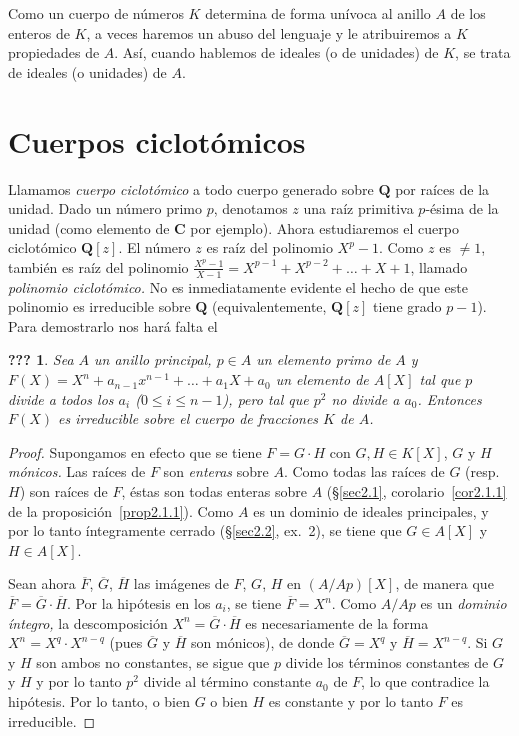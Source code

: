 \documentclass[10pt,oneside,bibtotoc,smallheadings,leqno,a5paper,DIV=12]{scrbook}
\newcommand{\QQ}{\mathbf{Q}}
\newcommand{\CC}{\mathbf{C}}
\newcommand{\QED}{}%
\newcommand{\oline}[1]{\overline{#1}}
\numberwithin{equation}{section}
\theoremstyle{defi}
\theoremstyle{enonce}
\newcommand{\namedname}{???}
\newtheorem*{namedthm}{\namedname}
\newenvironment{named}[1]%
	{\renewcommand{\namedname}{#1}%
	\begin{namedthm}}%
	{\end{namedthm}}
\theoremstyle{rem}
\numberwithin{theorem}{section}
\numberwithin{proposition}{section}
\numberwithin{definition}{section}
\numberwithin{lemma}{section}
\numberwithin{corollary}{section}
\numberwithin{example}{section}
\numberwithin{footnote}{section}%
\begin{document}
Como un cuerpo de n\'umeros $K$ determina de forma un\'ivoca al anillo $A$ de los enteros de $K$, a veces
haremos un abuso del lenguaje y le atribuiremos a $K$ propiedades de $A$. As\'i, cuando hablemos
de ideales (o de unidades) de $K$, se trata de ideales (o unidades) de $A$.

\section{Cuerpos ciclot\'omicos}\label{sec2.9}

Llamamos {\em cuerpo ciclot\'omico} a todo cuerpo generado sobre $\QQ$ por ra\'ices de la unidad. Dado
un n\'umero primo $p$, denotamos $z$ una ra\'iz primitiva $p$-\'esima de la unidad (como elemento
de $\CC$ por ejemplo). Ahora estudiaremos el cuerpo ciclot\'omico $\QQ[z]$.
El n\'umero $z$ es ra\'iz del polinomio $X^{p}-1$. Como $z$ es $\neq 1$, tambi\'en es ra\'iz del polinomio
$\frac{X^{p}-1}{X-1} = X^{p-1}+X^{p-2}+\dots+X+1$, llamado {\em polinomio ciclot\'omico.} No es inmediatamente
evidente el hecho de que este polinomio es irreducible sobre $\QQ$ (equivalentemente, $\QQ[z]$ tiene
grado $p-1$). Para demostrarlo nos har\'a falta el

\begin{named}{Criterio de Eisenstein}
Sea $A$ un anillo principal, $p\in A$ un elemento primo de $A$ y $F(X) = X^{n}+a_{n-1}x^{n-1}+\dots+a_{1}X+a_{0}$
un elemento de $A[X]$ tal que $p$ divide a todos los $a_{i}$ ($0\leq i\leq n-1${\upshape),} pero tal que $p^{2}$ no
divide a $a_{0}$. Entonces $F(X)$ es irreducible sobre el cuerpo de fracciones $K$ de $A$.
\end{named}

\begin{proof}
Supongamos en efecto que se tiene $F = G\cdot H$ con $G, H\in K[X]$, $G$ y $H$ {\em m\'onicos.} Las
ra\'ices de $F$ son {\em enteras} sobre $A$. Como todas las ra\'ices de $G$ (resp. $H$) son ra\'ices de $F$, \'estas
son todas enteras sobre $A$ (\S\ref{sec2.1}, corolario~\ref{cor2.1.1} de la proposici\'on~\ref{prop2.1.1}). Como $A$ es un dominio de ideales principales, y por
lo tanto \'integramente cerrado (\S\ref{sec2.2}, ex.~2), se tiene que $G\in A[X]$ y $H\in A[X]$.

Sean ahora $\oline F$, $\oline G$, $\oline H$ las im\'agenes de $F$, $G$, $H$ en $(A/Ap)[X]$, de manera que
$\oline F = \oline G\cdot\oline H$. Por la hip\'otesis en los $a_{i}$, se tiene $\oline F = X^{n}$.
Como $A/Ap$ es un {\em dominio \'integro,} la descomposici\'on $X^{n}=\oline G\cdot\oline H$ es necesariamente
de la forma $X^{n}=X^{q}\cdot X^{n-q}$ (pues $\oline G$ y $\oline H$ son m\'onicos), de donde
$\oline G = X^{q}$ y $\oline H = X^{n-q}$. Si $G$ y $H$ son ambos no constantes, se sigue que
$p$ divide los t\'erminos constantes de $G$ y $H$ y por lo tanto $p^{2}$ divide al t\'ermino constante
$a_{0}$ de $F$, lo que contradice la hip\'otesis. Por lo tanto, o bien $G$ o bien $H$ es constante y por
lo tanto $F$ es irreducible. \QED
\end{proof}
\end{document}
